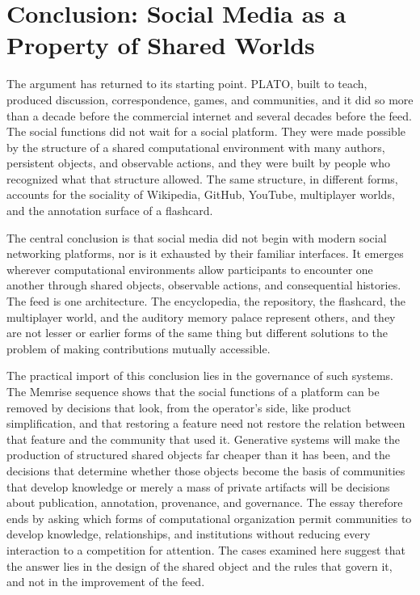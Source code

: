 \documentclass[11pt]{article}
\theoremstyle{remark}
\begin{document}
\section{Conclusion: Social Media as a Property of Shared Worlds}

The argument has returned to its starting point. PLATO, built to teach, produced discussion, correspondence, games, and communities, and it did so more than a decade before the commercial internet and several decades before the feed. The social functions did not wait for a social platform. They were made possible by the structure of a shared computational environment with many authors, persistent objects, and observable actions, and they were built by people who recognized what that structure allowed. The same structure, in different forms, accounts for the sociality of Wikipedia, GitHub, YouTube, multiplayer worlds, and the annotation surface of a flashcard.

The central conclusion is that social media did not begin with modern social networking platforms, nor is it exhausted by their familiar interfaces. It emerges wherever computational environments allow participants to encounter one another through shared objects, observable actions, and consequential histories. The feed is one architecture. The encyclopedia, the repository, the flashcard, the multiplayer world, and the auditory memory palace represent others, and they are not lesser or earlier forms of the same thing but different solutions to the problem of making contributions mutually accessible.

The practical import of this conclusion lies in the governance of such systems. The Memrise sequence shows that the social functions of a platform can be removed by decisions that look, from the operator's side, like product simplification, and that restoring a feature need not restore the relation between that feature and the community that used it. Generative systems will make the production of structured shared objects far cheaper than it has been, and the decisions that determine whether those objects become the basis of communities that develop knowledge or merely a mass of private artifacts will be decisions about publication, annotation, provenance, and governance. The essay therefore ends by asking which forms of computational organization permit communities to develop knowledge, relationships, and institutions without reducing every interaction to a competition for attention. The cases examined here suggest that the answer lies in the design of the shared object and the rules that govern it, and not in the improvement of the feed.
\end{document}
